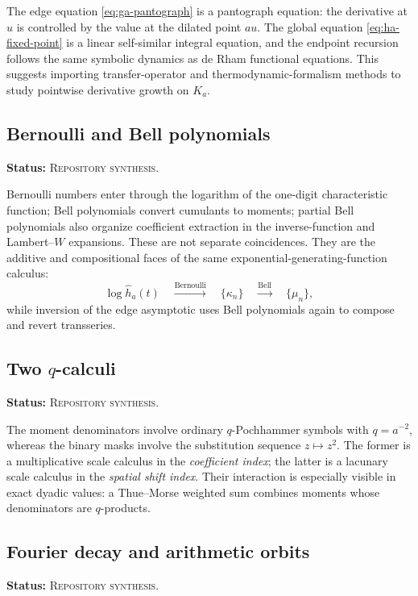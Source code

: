 \documentclass[11pt,oneside]{article}
\theoremstyle{definition}
\theoremstyle{remark}
\newcommand{\RepoStatus}{\textcolor{RepoOlive}{\textsc{Repository synthesis}}}
\newcommand{\status}[1]{\par\smallskip\noindent\textbf{Status:} #1.\par\smallskip}
\begin{document}
The edge equation \eqref{eq:ga-pantograph} is a pantograph equation: the derivative at \(u\) is controlled by the value at the dilated point \(au\).  The global equation \eqref{eq:ha-fixed-point} is a linear self-similar integral equation, and the endpoint recursion follows the same symbolic dynamics as de Rham functional equations.  This suggests importing transfer-operator and thermodynamic-formalism methods to study pointwise derivative growth on \(K_a\).

\subsection{Bernoulli and Bell polynomials}
\status{\RepoStatus}

Bernoulli numbers enter through the logarithm of the one-digit characteristic function; Bell polynomials convert cumulants to moments; partial Bell polynomials also organize coefficient extraction in the inverse-function and Lambert--\(W\) expansions.  These are not separate coincidences.  They are the additive and compositional faces of the same exponential-generating-function calculus:
\begin{equation}
  \log\widehat h_a(t)
  \quad\xrightarrow{\text{Bernoulli}}\quad
  \{\kappa_n\}
  \quad\xrightarrow{\text{Bell}}\quad
  \{\mu_n\},
  \label{eq:bern-bell-pipeline}
\end{equation}
while inversion of the edge asymptotic uses Bell polynomials again to compose and revert transseries.

\subsection{Two \texorpdfstring{\(q\)}{q}-calculi}
\status{\RepoStatus}

The moment denominators involve ordinary \(q\)-Pochhammer symbols with \(q=a^{-2}\), whereas the binary masks involve the substitution sequence \(z\mapsto z^2\).  The former is a multiplicative scale calculus in the \emph{coefficient index}; the latter is a lacunary scale calculus in the \emph{spatial shift index}.  Their interaction is especially visible in exact dyadic values: a Thue--Morse weighted sum combines moments whose denominators are \(q\)-products.

\subsection{Fourier decay and arithmetic orbits}
\status{\RepoStatus}
\end{document}

